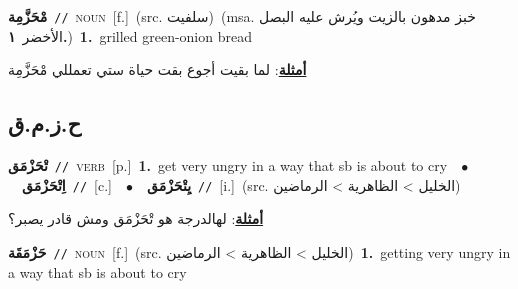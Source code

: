 \documentclass[10pt,a4paper,twoside]{article} %
\begin{document}
\begin{multicols}{2}
{\setlength\topsep{0pt}\textbf{\foreignlanguage{arabic}{مْحَزَّمِة}}\ {\color{gray}\texttt{//}\color{black}}\ \textsc{noun}\ [f.]\ (src. \color{gray}\foreignlanguage{arabic}{سلفيت}\color{black})\ \color{gray}(msa. \foreignlanguage{arabic}{خبز مدهون بالزيت ويُرش عليه البصل الأخضر}~\foreignlanguage{arabic}{\textbf{١.}})\color{black}\ \textbf{1.}~grilled green-onion bread\  \begin{flushright}\color{gray}\foreignlanguage{arabic}{\textbf{\underline{\foreignlanguage{arabic}{أمثلة}}}: لما بقيت أجوع بقت حياة ستي تعمللي مْحَزَّمِة}\end{flushright}\color{black}} \vspace{2mm}

\vspace{-3mm}
\subsection*{\color{blue}\foreignlanguage{arabic}{ح.ز.م.ق}\color{blue}{}} 

{\setlength\topsep{0pt}\textbf{\foreignlanguage{arabic}{تْحَزْمَق}}\ {\color{gray}\texttt{//}\color{black}}\ \textsc{verb}\ [p.]\ \textbf{1.}~get very ungry in a way that sb is about to cry\ \ $\bullet$\ \ \setlength\topsep{0pt}\textbf{\foreignlanguage{arabic}{اِتْحَزْمَق}}\ {\color{gray}\texttt{//}\color{black}}\ [c.]\ \ $\bullet$\ \ \setlength\topsep{0pt}\textbf{\foreignlanguage{arabic}{يِتْحَزْمَق}}\ {\color{gray}\texttt{//}\color{black}}\ [i.]\ (src. \color{gray}\foreignlanguage{arabic}{الخليل > الظاهرية > الرماضين}\color{black})\  \begin{flushright}\color{gray}\foreignlanguage{arabic}{\textbf{\underline{\foreignlanguage{arabic}{أمثلة}}}: لهالدرجة هو تْحَزْمَق ومش قادر يصبر؟}\end{flushright}\color{black}} \vspace{2mm}

{\setlength\topsep{0pt}\textbf{\foreignlanguage{arabic}{حَزْمَقَة}}\ {\color{gray}\texttt{//}\color{black}}\ \textsc{noun}\ [f.]\ (src. \color{gray}\foreignlanguage{arabic}{الخليل > الظاهرية > الرماضين}\color{black})\ \textbf{1.}~getting very ungry in a way that sb is about to cry\ } \vspace{2mm}


\end{multicols}
\end{document}
